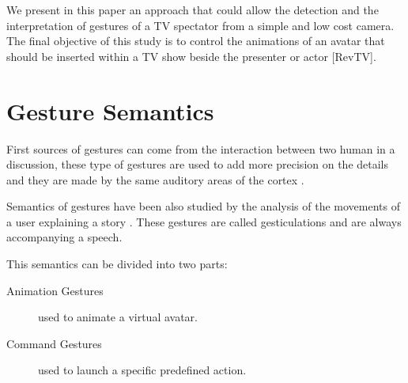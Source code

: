 \documentclass{llncs}
\newcommand\ignore[1]{}
\begin{document}
We present in this paper an approach that could allow the detection and the interpretation of gestures of a TV spectator from a simple and low cost camera. 
The final objective of this study is to control the animations of an avatar that should be inserted within a TV show beside the presenter or actor [RevTV].

\section{Gesture Semantics}
First sources of gestures can come from the interaction between two human in a
discussion, these type of gestures are used to add more precision on the details
and they are made by the same auditory areas of the cortex \cite{SymbolicGest}.

Semantics of gestures have been also studied by the analysis of the movements of
a user explaining a story \cite{gestureThought}.
These gestures are called gesticulations and are always accompanying a speech. 

This semantics can be divided into two parts:

\begin{description}
 \item[Animation Gestures] used to animate a virtual avatar.
 \item[Command Gestures] used to launch a specific predefined action.
\end{description}


\ignore{
Gesture recognition got the attention of HCI researchers in order to find better
ways to talk to the computer. The first one was the Hand Gestural Cursor
(Put-That-There[]) aiming to the simplification of the means of communication
between human and the machine.
Since then, the gesture definition included more techniques and got applied on
the 2D recognition which is the multi-touch gestures.
}
\end{document}
